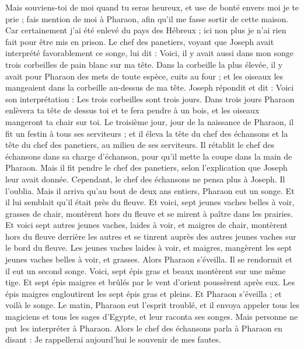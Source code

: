 \begin{multicols}{2}
Mais souviens-toi de moi quand tu  seras heureux, et use de bonté envers moi je te prie ; fais mention de moi à Pharaon, afin  qu’il me fasse sortir de cette maison.
Car certainement j'ai été enlevé du pays des Hébreux ; ici non plus je n’ai rien fait  pour  être mis en prison.
Le chef des panetiers, voyant que Joseph avait interprété favorablement ce songe, lui dit : Voici, il y avait aussi dans mon songe trois corbeilles de pain blanc sur ma tête.
Dans la corbeille la plus élevée, il y avait pour Pharaon des mets de toute espèce, cuits au four ; et les oiseaux les mangeaient dans la corbeille au-dessus de ma tête.
Joseph répondit et dit : Voici son interprétation : Les trois corbeilles sont trois jours.
Dans trois jours Pharaon enlèvera ta tête de dessus toi et te fera pendre à un bois, et les oiseaux mangeront ta chair sur toi.
Le troisième jour, jour de la naissance de Pharaon, il fit un festin à tous ses serviteurs ; et il éleva la tête du chef des échansons et la tête du chef des panetiers, au milieu de ses serviteurs.
Il rétablit le chef des échansons dans sa charge d’échanson, pour qu’il mette la coupe dans la main de Pharaon.
Mais il fit pendre le chef des panetiers, selon l’explication que Joseph leur avait donnée.
Cependant, le chef des échansons ne pensa plus à Joseph. Il l’oublia.
\VerseOne{}Mais il arriva qu’au bout de deux ans entiers, Pharaon eut un songe. Et il lui semblait qu'il était près du fleuve.
Et voici, sept jeunes vaches belles à voir, grasses de chair, montèrent hors du fleuve et se mirent à paître dans les  prairies.
Et voici sept autres jeunes vaches, laides à voir, et maigres de chair, montèrent hors du fleuve derrière les autres et se tinrent auprès des autres jeunes vaches sur le bord du fleuve.
Les jeunes vaches laides à voir, et maigres, mangèrent les sept jeunes vaches belles à voir, et grasses. Alors Pharaon s'éveilla.
Il se rendormit et il eut un second songe. Voici, sept épis gras et beaux montèrent sur une même tige.
Et sept épis maigres et brûlés par le vent d’orient poussèrent après eux.
Les épis maigres engloutirent les sept épis gras et pleins. Et Pharaon s'éveilla ; et voilà le songe.
Le matin, Pharaon eut l’esprit troublé, et il envoya appeler tous les magiciens et tous les sages d'Egypte, et leur raconta ses songes.  Mais personne ne put les interpréter à Pharaon.
Alors le chef des échansons parla à Pharaon en disant : Je rappellerai aujourd'hui le souvenir de mes fautes.

\end{multicols}
